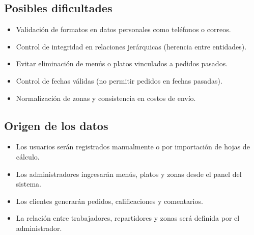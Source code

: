 \documentclass[12pt,a4paper]{article}
\begin{document}
\subsection{Posibles dificultades}
\begin{itemize}
  \item Validación de formatos en datos personales como teléfonos o correos.
  \item Control de integridad en relaciones jerárquicas (herencia entre entidades).
  \item Evitar eliminación de menús o platos vinculados a pedidos pasados.
  \item Control de fechas válidas (no permitir pedidos en fechas pasadas).
  \item Normalización de zonas y consistencia en costos de envío.
\end{itemize}

\subsection{Origen de los datos}
\begin{itemize}
  \item Los usuarios serán registrados manualmente o por importación de hojas de cálculo.
  \item Los administradores ingresarán menús, platos y zonas desde el panel del sistema.
  \item Los clientes generarán pedidos, calificaciones y comentarios.
  \item La relación entre trabajadores, repartidores y zonas será definida por el administrador.
\end{itemize}
\end{document}
